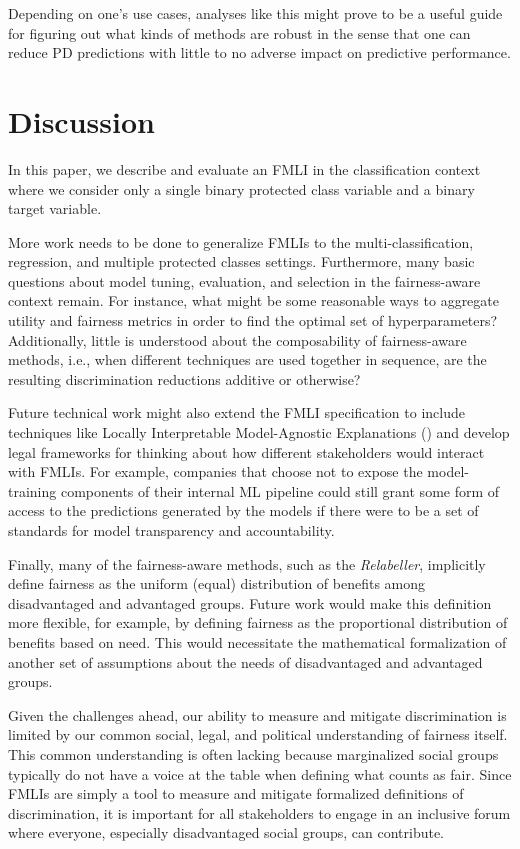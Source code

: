 \documentclass[man,natbib]{apa6}
\begin{document}
Depending on one's use cases, analyses like this might prove to be a useful
guide for figuring out what kinds of methods are robust in the sense that one
can reduce PD predictions with little to no adverse
impact on predictive performance.

\section{Discussion}

In this paper, we describe and evaluate an FMLI in the classification context
where we consider only a single binary protected class variable and a binary
target variable.

More work needs to be done to generalize FMLIs to the multi-classification,
regression, and multiple protected classes settings. Furthermore, many basic
questions about model tuning, evaluation, and selection in the fairness-aware
context remain. For instance, what might be some reasonable ways to aggregate
utility and fairness metrics in order to find the optimal set of
hyperparameters? Additionally, little is understood about the composability of
fairness-aware methods, i.e., when different techniques are used together in
sequence, are the resulting discrimination reductions additive or otherwise?

Future technical work might also extend the FMLI specification to include
techniques like Locally Interpretable Model-Agnostic Explanations
(\citealp{ribeiro2016should}) and develop legal frameworks for thinking about how
different stakeholders would interact with FMLIs. For example, companies that
choose not to expose the model-training components of their internal ML
pipeline could still grant some form of access to the predictions generated by
the models if there were to be a set of standards for model transparency and
accountability.

Finally, many of the fairness-aware methods, such as the \emph{Relabeller},
implicitly define fairness as the uniform (equal) distribution of benefits among
disadvantaged and advantaged groups. Future work would make this definition more
flexible, for example, by defining fairness as the proportional distribution of
benefits based on need. This would necessitate the mathematical formalization of
another set of assumptions about the needs of disadvantaged and advantaged
groups.

Given the challenges ahead, our ability to measure and mitigate discrimination
is limited by our common social, legal, and political understanding of fairness
itself. This common understanding is often lacking because marginalized social
groups typically do not have a voice at the table when defining what counts as
fair. Since FMLIs are simply a tool to measure and mitigate formalized
definitions of discrimination, it is important for all stakeholders to engage in
an inclusive forum where everyone, especially disadvantaged social groups, can
contribute.

\nocite{*}

\end{document}
